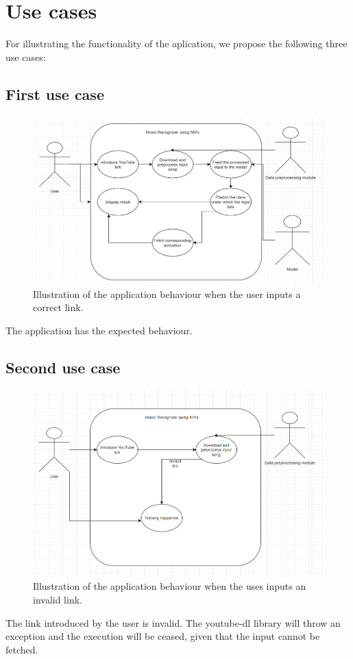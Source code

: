 \chapter{Use cases}

For illustrating the functionality of the aplication, we propose the following three use cases:

\section{First use case}

\begin{figure}[H]
	\centering
	\includegraphics[width = 5.5in]{images/usecase1.png}
	\caption{Illustration of the application behaviour when the user inputs a correct link.}
	\label{uc1}
	\end{figure}
The application has the expected behaviour.
\section{Second use case}
\begin{figure}[H]
	\centering
	\includegraphics[width = 5.5in]{images/usecase3.png}
	\caption{Illustration of the application behaviour when the uses inputs an invalid link. }
	\label{uc3}
	\end{figure}
The link introduced by the user is invalid. The youtube-dl library will throw an exception and the execution will be ceased, given that the input cannot be fetched.

